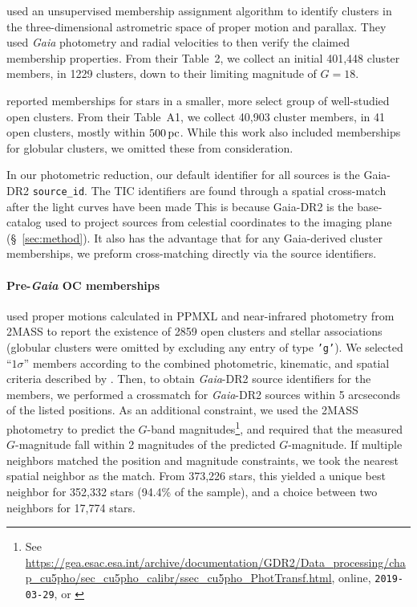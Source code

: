 \documentclass[12pt,twocolumn,tighten]{aastex62}
\begin{document}
\citet{cantat-gaudin_gaia_2018} used an unsupervised membership
assignment algorithm to identify clusters in the three-dimensional
astrometric space of proper motion and parallax. They used {\it Gaia}
photometry and radial velocities to then verify the claimed
membership properties.  From their Table~2, we collect an initial 401{,}448
cluster members, in 1229 clusters, down to their limiting magnitude of
$G=18$.

\citet{gaia_hr_2018} reported memberships for stars in a smaller, more
select group of well-studied open clusters. From their Table~A1, we
collect 40{,}903 cluster members, in 41 open clusters, mostly within
$500\,{\rm pc}$. While this work also included memberships for
globular clusters, we omitted these from consideration.

In our photometric reduction,  our default identifier for all sources
is the Gaia-DR2 \texttt{source\_id}.
The TIC identifiers are found through a spatial cross-match after the light 
curves have been made
\citep{stassun_TIC_2018,stassun_TIC8_2019}
This is because Gaia-DR2 is the base-catalog used to project
sources from celestial coordinates to the imaging plane (\S~\ref{sec:method}).
It also has the advantage that for any Gaia-derived cluster memberships, 
we preform cross-matching directly via the source identifiers.



\paragraph{Pre-{\it Gaia} OC memberships}
\citet{Kharchenko_et_al_2013} used proper motions calculated in PPMXL
\citep[][a combination of USNO-B1{.}0 and 2MASS
astrometry]{roeser_ppmxl_2010} and near-infrared photometry from 2MASS
\citep{skrutskie_tmass_2006} to report the existence of 2859 open
clusters and stellar associations (globular clusters were
omitted by excluding any entry of type \texttt{'g'}).
We selected ``$1\sigma$'' members according to the
combined photometric, kinematic, and spatial criteria described by
\citet{kharchenko_global_2012}.  Then, to obtain {\it Gaia}-DR2 source
identifiers for the members, we performed a crossmatch for {\it
Gaia}-DR2 sources within 5 arcseconds of the listed positions.  As an
additional constraint, we used the 2MASS photometry to predict the
$G$-band magnitudes\footnote{See
\url{https://gea.esac.esa.int/archive/documentation/GDR2/Data_processing/chap_cu5pho/sec_cu5pho_calibr/ssec_cu5pho_PhotTransf.html},
online, \texttt{2019-03-29}, or \citet{carrasco_gaia_2016}}, and
required that the measured $G$-magnitude fall within 2 magnitudes of
the predicted $G$-magnitude.  If multiple neighbors matched the
position and magnitude constraints, we took the nearest spatial
neighbor as the match.  From 373{,}226 stars, this yielded a unique
best neighbor for 352{,}332 stars (94.4\% of the sample), and a choice
between two neighbors for 17{,}774 stars. 
\end{document}
